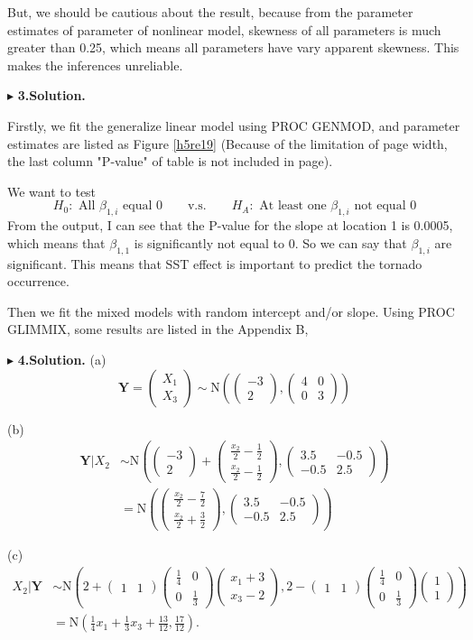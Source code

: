\documentclass[letterpaper, 12pt]{article}
\newcommand{\ba}{$$\begin{aligned}}
\newcommand{\ea}{\end{aligned}$$}
\newcommand{\lma}{\left(\begin{matrix}}
\newcommand{\rma}{\end{matrix}\right)}
\begin{document}
But, we should be cautious about the result, because from the parameter estimates of parameter of nonlinear model, skewness of all parameters is much greater than 0.25, which means all parameters have vary apparent skewness. This makes the inferences unreliable.


$\blacktriangleright$ \textbf{3.\quad Solution.} 

Firstly, we fit the generalize linear model using PROC GENMOD, and parameter estimates are listed as Figure \ref{h5re19} (Because of the limitation of page width, the last column "P-value" of table is not included in page).

We want to test
$$
H_0: \text{ All $\beta_{1,i}$ equal 0}\qquad\text{v.s.}\qquad H_A: \text{ At least one $\beta_{1,i}$ not equal 0}
$$
From the output, I can see that the P-value for the slope at location 1 is 0.0005, which means that $\beta_{1,1}$ is significantly not equal to 0. So we can say that $\beta_{1,i}$ are significant. This means that SST effect is important to predict the tornado occurrence. 

Then we fit the mixed models with random intercept and/or slope. Using PROC GLIMMIX, some results are listed in the Appendix B,





$\blacktriangleright$ \textbf{4.\quad Solution.} 
(a) 
$$
\bm{Y}=\lma X_1\\X_3\rma\sim \text{N}\left(\lma -3 \\2\rma,\lma 4&0\\0&3\rma\right)
$$

(b)
\ba
\bm{Y}|X_2&\sim\text{N}\left(\lma -3\\2\rma+\lma \frac{x_2}{2}-\frac12\\\frac{x_2}2-\frac12\rma,\lma 3.5 &-0.5\\-0.5 &2.5\rma\right)\\
&=\text{N}\left(\lma \frac{x_2}{2}-\frac72\\\frac{x_2}2+\frac32\rma,\lma 3.5 &-0.5\\-0.5 &2.5\rma\right)
\ea


(c)
\ba
X_2|\bm{Y}&\sim\text{N}\left(2+\lma 1&1\rma\lma \frac14&0\\0&\frac13\rma\lma x_1+3\\x_3-2\rma, 2-\lma 1&1\rma\lma \frac14&0\\0&\frac13\rma\lma1\\1\rma\right)\\
&=\text{N}\left(\frac14x_1+\frac13x_3+\frac{13}{12},\frac{17}{12}\right).
\ea
\end{document}
